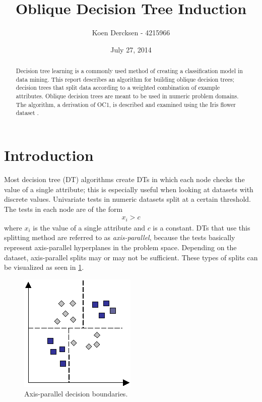 \documentclass[12pt]{article}
\title{Oblique Decision Tree Induction}
\author{Koen Dercksen - 4215966}
\date{July 27, 2014}
\begin{document}
\maketitle

\begin{abstract}
Decision tree learning is a commonly used method of creating a classification model in data mining. This report describes an algorithm for building oblique decision trees; decision trees that split data according to a weighted combination of example attributes. Oblique decision trees are meant to be used in numeric problem domains. The algorithm, a derivation of OC1, is described and examined using the Iris flower dataset \cite{Bache+Lichman:2013}.
\end{abstract}

\bigskip

\section{Introduction}
Most decision tree (DT) algorithms create DTs in which each node checks the value of a single attribute; this is especially useful when looking at datasets with discrete values. Univariate tests in numeric datasets split at a certain threshold. The tests in each node are of the form
\begin{align*}
x_i > c
\end{align*}
where $x_i$ is the value of a single attribute and $c$ is a constant. DTs that use this splitting method are referred to as \emph{axis-parallel}, because the tests basically represent axis-parallel hyperplanes in the problem space. Depending on the dataset, axis-parallel splits may or may not be sufficient. These types of splits can be visualized as seen in \cref{fig:axisparallel}.

\begin{figure}[!ht]
\centering
\includegraphics[scale=0.5]{images/axisparallel.png}
\caption{Axis-parallel decision boundaries.}
\label{fig:axisparallel}
\end{figure}
\end{document}
